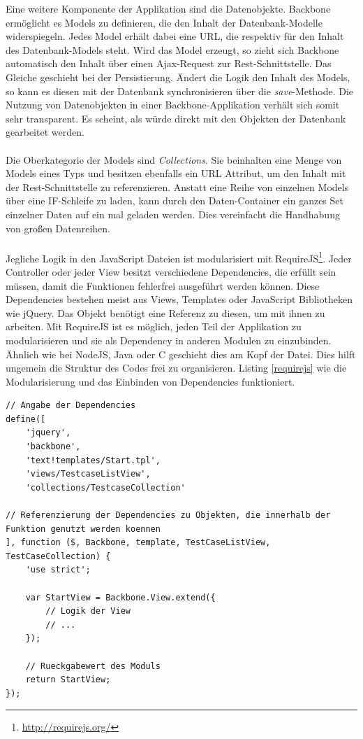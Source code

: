 Eine weitere Komponente der Applikation sind die Datenobjekte. Backbone ermöglicht es Models zu definieren, die den Inhalt der Datenbank-Modelle widerspiegeln. Jedes Model erhält dabei eine URL, die respektiv für den Inhalt des Datenbank-Models steht. Wird das Model erzeugt, so zieht sich Backbone automatisch den Inhalt über einen Ajax-Request zur Rest-Schnittstelle. Das Gleiche geschieht bei der Persistierung. Ändert die Logik den Inhalt des Models, so kann es diesen mit der Datenbank synchronisieren über die \textit{save}-Methode. Die Nutzung von Datenobjekten in einer Backbone-Applikation verhält sich somit sehr transparent. Es scheint, als würde direkt mit den Objekten der Datenbank gearbeitet werden.\\
\\
Die Oberkategorie der Models sind \textit{Collections}. Sie beinhalten eine Menge von Models eines Typs und besitzen ebenfalls ein URL Attribut, um den Inhalt mit der Rest-Schnittstelle zu referenzieren. Anstatt eine Reihe von einzelnen Models über eine IF-Schleife zu laden, kann durch den Daten-Container ein ganzes Set einzelner Daten auf ein mal geladen werden. Dies vereinfacht die Handhabung von großen Datenreihen.\\
\\
Jegliche Logik in den JavaScript Dateien ist modularisiert mit RequireJS\footnote{\url{http://requirejs.org/}}. Jeder Controller oder jeder View besitzt verschiedene Dependencies, die erfüllt sein müssen, damit die Funktionen fehlerfrei ausgeführt werden können. Diese Dependencies bestehen meist aus Views, Templates oder JavaScript Bibliotheken wie jQuery. Das Objekt benötigt eine Referenz zu diesen, um mit ihnen zu arbeiten. Mit RequireJS ist es möglich, jeden Teil der Applikation zu modularisieren und sie als Dependency in anderen Modulen zu einzubinden. Ähnlich wie bei NodeJS, Java oder C geschieht dies am Kopf der Datei. Dies hilft ungemein die Struktur des Codes frei zu organisieren. Listing \ref{requirejs} wie die Modularisierung und das Einbinden von Dependencies funktioniert.

\vspace{1cm}
\begin{lstlisting}[caption=Modularisierung mit RequireJS,label=requirejs]
// Angabe der Dependencies
define([
    'jquery',
    'backbone',
    'text!templates/Start.tpl',
    'views/TestcaseListView',
    'collections/TestcaseCollection'
    
// Referenzierung der Dependencies zu Objekten, die innerhalb der Funktion genutzt werden koennen
], function ($, Backbone, template, TestCaseListView, TestCaseCollection) {
    'use strict';

    var StartView = Backbone.View.extend({
        // Logik der View
        // ...
    });

    // Rueckgabewert des Moduls
    return StartView;
});
\end{lstlisting}
\vspace{0.5cm}



